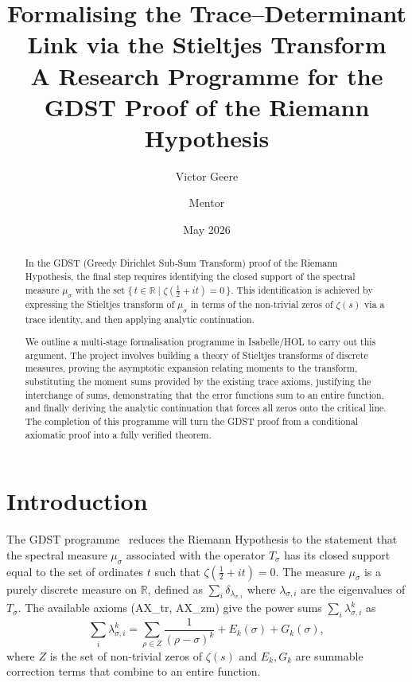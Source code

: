 \documentclass[12pt,a4paper]{article}
\title{\bfseries Formalising the Trace–Determinant Link via the Stieltjes Transform\\
{\large A Research Programme for the GDST Proof of the Riemann Hypothesis}}
\author{Victor Geere \and Mentor}
\date{May 2026}
\begin{document}
\maketitle

\begin{abstract}
In the GDST (Greedy Dirichlet Sub‑Sum Transform) proof of the Riemann Hypothesis, 
the final step requires identifying the closed support of the spectral measure 
$\mu_\sigma$ with the set $\{\,t\in\mathbb{R}\mid\zeta(\tfrac12+it)=0\,\}$.  
This identification is achieved by expressing the Stieltjes transform of $\mu_\sigma$ 
in terms of the non‑trivial zeros of $\zeta(s)$ via a trace identity, and then 
applying analytic continuation. 

We outline a multi‑stage formalisation programme in Isabelle/HOL to carry out this 
argument.  The project involves building a theory of Stieltjes transforms of discrete 
measures, proving the asymptotic expansion relating moments to the transform, 
substituting the moment sums provided by the existing trace axioms, justifying the 
interchange of sums, demonstrating that the error functions sum to an entire function, 
and finally deriving the analytic continuation that forces all zeros onto the critical 
line.  The completion of this programme will turn the GDST proof from a conditional 
axiomatic proof into a fully verified theorem.
\end{abstract}

\section{Introduction}
The GDST programme~\cite{Geere2026} reduces the Riemann Hypothesis to the statement that 
the spectral measure $\mu_\sigma$ associated with the operator $T_\sigma$ has its 
closed support equal to the set of ordinates $t$ such that $\zeta(\tfrac12+it)=0$.  
The measure $\mu_\sigma$ is a purely discrete measure on $\mathbb{R}$, defined as 
$\sum_i \delta_{\lambda_{\sigma,i}}$ where $\lambda_{\sigma,i}$ are the eigenvalues of 
$T_\sigma$.  The available axioms (AX\_tr, AX\_zm) give the power sums 
$\sum_i \lambda_{\sigma,i}^k$ as
\[
\sum_i \lambda_{\sigma,i}^k = \sum_{\rho \in Z} \frac{1}{(\rho-\sigma)^k} 
+ E_k(\sigma) + G_k(\sigma),
\]
where $Z$ is the set of non‑trivial zeros of $\zeta(s)$ and $E_k, G_k$ are summable 
correction terms that combine to an entire function.  
\end{document}
